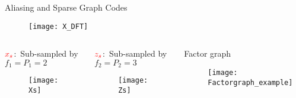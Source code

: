 	\begin{frame}{Aliasing and Sparse Graph Codes}
		
		\begin{block}{}
			\begin{figure}[t]
				\centering
				\texttt{[image: X\_DFT]}
			\end{figure}
		\end{block}
		
		\begin{columns}
			
			\column{.47\textwidth}
			\begin{block}{{\small $\color{red}x_s$:\ Sub-sampled by $f_1=P_1=2$}}
				\begin{figure}[t]
					\centering
					\texttt{[image: Xs]}
				\end{figure}
			\end{block}
			
			\begin{block}{{\small$\color{red}z_s$:\ Sub-sampled by $f_2=P_2=3$}}
				\begin{figure}[t]
					\centering
					\texttt{[image: Zs]}
				\end{figure}
			\end{block}
			
			\begin{block}{\small Factor graph}
				\begin{figure}[t]
					\centering
					\texttt{[image: Factorgraph\_example]}
				\end{figure}
			\end{block}
		\end{columns}
	\end{frame}

